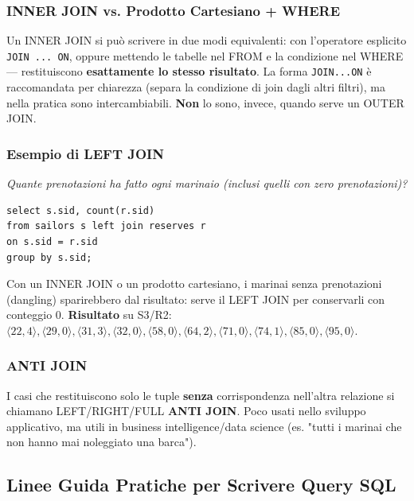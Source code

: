 \documentclass[12pt, a4paper]{article}
\begin{document}
\subsubsection{INNER JOIN vs. Prodotto Cartesiano + WHERE}
Un INNER JOIN si può scrivere in due modi equivalenti: con l'operatore esplicito \texttt{JOIN ... ON}, oppure mettendo le tabelle nel FROM e la condizione nel WHERE — restituiscono \textbf{esattamente lo stesso risultato}. La forma \texttt{JOIN...ON} è raccomandata per chiarezza (separa la condizione di join dagli altri filtri), ma nella pratica sono intercambiabili. \textbf{Non} lo sono, invece, quando serve un OUTER JOIN.

\subsubsection{Esempio di LEFT JOIN}
\label{sec:leftjoin-esempio}
\textit{Quante prenotazioni ha fatto ogni marinaio (inclusi quelli con zero prenotazioni)?}
\begin{verbatim}
select s.sid, count(r.sid)
from sailors s left join reserves r
on s.sid = r.sid
group by s.sid;
\end{verbatim}
Con un INNER JOIN o un prodotto cartesiano, i marinai senza prenotazioni (dangling) sparirebbero dal risultato: serve il LEFT JOIN per conservarli con conteggio 0. \textbf{Risultato} su S3/R2: $\langle 22,4\rangle, \langle 29,0\rangle, \langle 31,3\rangle, \langle 32,0\rangle, \langle 58,0\rangle, \langle 64,2\rangle, \langle 71,0\rangle, \langle 74,1\rangle, \langle 85,0\rangle, \langle 95,0\rangle$.

\subsubsection{ANTI JOIN}
I casi che restituiscono solo le tuple \textbf{senza} corrispondenza nell'altra relazione si chiamano LEFT/RIGHT/FULL \textbf{ANTI JOIN}. Poco usati nello sviluppo applicativo, ma utili in business intelligence/data science (es. "tutti i marinai che non hanno mai noleggiato una barca").

\subsection{Linee Guida Pratiche per Scrivere Query SQL}
\end{document}
